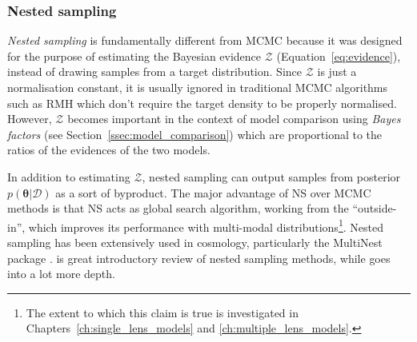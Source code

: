 \documentclass[12pt,dvipsnames]{report}
\newcommand{\ssf}[1]{\textsf{#1}}
\renewcommand{\vec}[1]{\boldsymbol{\mathbf{#1}}}
\begin{document}
\subsubsection{Nested sampling}
\label{sssec:ns}
\emph{Nested sampling} \citep{2004AIPC..735..395S}  is fundamentally different 
from MCMC because it was designed for the purpose  of estimating the
Bayesian evidence  $\mathcal{Z}$ (Equation~\ref{eq:evidence}), instead of drawing samples 
from  a target distribution.
Since $\mathcal{Z}$ is just a normalisation constant, it is usually ignored 
in traditional MCMC algorithms such as RMH which don't require the target 
density to be properly normalised.
However, $\mathcal{Z}$  becomes important in the context of model comparison 
using \emph{Bayes factors} (see Section~\ref{ssec:model_comparison}) which
are proportional to the ratios of the evidences of the two models. 

In addition to estimating $\mathcal{Z}$, nested sampling can output samples 
from posterior $p(\vec\theta\lvert \mathcal{D})$ as a sort of byproduct. 
The major advantage of NS over MCMC methods is that NS acts as 
global search algorithm, working from the ``outside-in'', which improves its 
performance with multi-modal distributions\footnote{
    The extent to which this claim is true is investigated in 
    Chapters~\ref{ch:single_lens_models} and \ref{ch:multiple_lens_models}.
}. Nested sampling has been extensively used in cosmology, 
particularly the \ssf{MultiNest} package \citep{arXiv:0809.3437}. 
\citet{arXiv:2205.15570} is great introductory review of nested sampling methods, while 
\citet{arXiv:2101.09675} goes into a lot more depth.
\end{document}
